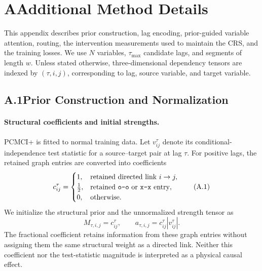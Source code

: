 \documentclass[letterpaper]{article}
\begin{document}
\section{A\quad Additional Method Details}
This appendix describes prior construction, lag encoding, prior-guided variable attention, routing, the intervention measurements used to maintain the CRS, and the training losses. We use $N$ variables, $\tau_{\max}$ candidate lags, and segments of length $w$. Unless stated otherwise, three-dimensional dependency tensors are indexed by $(\tau,i,j)$, corresponding to lag, source variable, and target variable.

\subsection{A.1\quad Prior Construction and Normalization}

\paragraph{Structural coefficients and initial strengths.}
PCMCI+ is fitted to normal training data. Let $v^\tau_{ij}$ denote its conditional-independence test statistic for a source--target pair at lag $\tau$. For positive lags, the retained graph entries are converted into coefficients
\begin{equation}
c^\tau_{ij}=
\begin{cases}
1, & \text{retained directed link } i\to j,\\
\tfrac{1}{2}, & \text{retained \texttt{o-o} or \texttt{x-x} entry},\\
0, & \text{otherwise}.
\end{cases}
\tag{A.1}
\end{equation}
We initialize the structural prior and the unnormalized strength tensor as
\begin{equation}
M_{\tau,i,j}=c^\tau_{ij},\qquad a_{\tau,i,j}=c^\tau_{ij}|v^\tau_{ij}|.
\tag{A.2}
\end{equation}
The fractional coefficient retains information from these graph entries without assigning them the same structural weight as a directed link. Neither this coefficient nor the test-statistic magnitude is interpreted as a physical causal effect.
\end{document}
